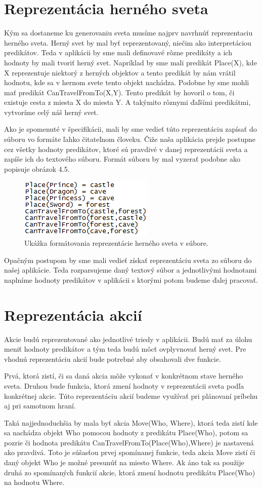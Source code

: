 \section{Reprezentácia herného sveta}
Kým sa dostaneme ku generovaniu sveta musíme najprv navrhnúť reprezentaciu herného sveta. Herný svet by mal byť reprezentovaný, niečim ako interpretáciou predikátov. Teda v aplikácii by sme mali definovavé rôzne predikáty a ich hodnoty by mali tvoriť herný svet. Napríklad by sme mali predikát Place(X), kde X reprezentuje niektorý z herných objektov a tento predikát by nám vrátil hodnotu, kde sa v hernom svete tento objekt nachádza. Podobne by sme mohli mať predikát CanTravelFromTo(X,Y). Tento predikát by hovoril o tom, či existuje cesta z miesta X do miesta Y. A takýmito rôznymi ďaľšími predikátmi, vytvoríme celý náš herný svet.\par
Ako je spomenuté v špecifikácii, mali by sme vedieť túto reprezentáciu zapísať do súboru vo formáte ľahko čitateľnom človeku. Čiže naša aplikácia prejde postupne cez všetky hodnoty predikátov, ktoré sú pravdivé v danej reprezentácii sveta a zapíše ich do textového súboru. Formát súboru by mal vyzerať podobne ako popisuje obrázok 4.5.
\begin{figure}[H] 
\begin{center}
\includegraphics[scale=1.0]{img/dosuboru.png}
\caption{Ukážka formátovania reprezentácie herného sveta v súbore.}
\label{fig:ch45}
\end{center}
\end{figure}
Opačným postupom by sme mali vedieť získať reprezentáciu sveta zo súboru do našej aplikácie. Teda rozparsujeme daný textový súbor a jednotlivými hodnotami naplníme hodnoty predikátov v aplikácii s ktorými potom budeme ďalej pracovať.
\section{Reprezentácia akcií}
Akcie budú reprezentované ako jednotlivé triedy v aplikácii. Budú mať za úlohu meniť hodnoty predikátov a tým teda budú môcť ovplyvnovať herný svet. Pre vhodnú reprezentáciu akcií bude potrebné aby obsahovali dve funkcie.\par
Prvá, ktorá zistí, či sa daná akcia môže vykonať v konkrétnom stave herného sveta. Druhou bude funkcia, ktorá zmení hodnoty v reprezentácii sveta podľa konkrétnej akcie. Túto reprezentáciu akcií budeme využívať pri plánovaní príbehu aj pri samotnom hraní.\par
Taká najjednoduchšia by mala byť akcia Move(Who, Where), ktorá teda zistí kde sa nachádza objekt Who pomocou hodnoty z predikátu Place(Who), potom sa pozrie či hodnota predikátu CanTravelFromTo(Place(Who),Where) je nastavená ako pravdivá. Toto je súšasťou prvej spomínanej funkcie, teda akcia Move zistí či daný objekt Who je možné presunúť na miesto Where. Ak áno tak sa použije druhá zo spomínaných funkcií akcie, ktorá zmení hodnotu predikátu Place(Who) na hodnotu Where.
